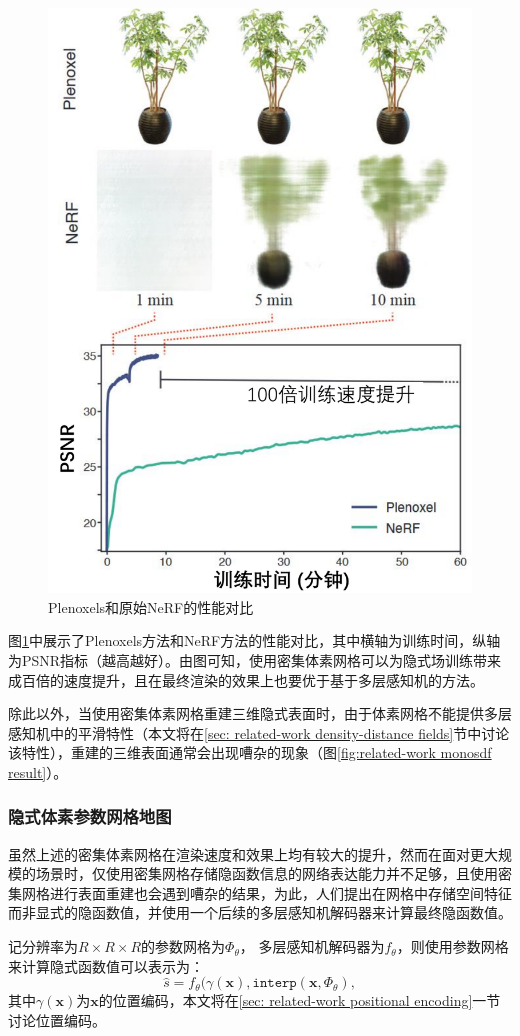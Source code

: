 \begin{figure}[ht]
    \centering
    \includegraphics[width=.5\textwidth]{undergraduate-thesis/images/related-work/plenoxels-result.pdf}
    \caption{Plenoxels\cite{fridovich-keil_plenoxels_2022}和原始NeRF\cite{mildenhall_nerf_2020}的性能对比}
    \label{fig:related-work plenoxels-result}
\end{figure}

图\ref{fig:related-work plenoxels-result}中展示了Plenoxels方法和NeRF方法的性能对比，其中横轴为训练时间，纵轴为PSNR指标（越高越好）。由图可知，使用密集体素网格可以为隐式场训练带来成百倍的速度提升，且在最终渲染的效果上也要优于基于多层感知机的方法。

除此以外，当使用密集体素网格重建三维隐式表面时，由于体素网格不能提供多层感知机中的平滑特性（本文将在\ref{sec: related-work density-distance fields}节中讨论该特性），重建的三维表面通常会出现嘈杂的现象（图\ref{fig:related-work monosdf result}）。

\subsubsection{隐式体素参数网格地图}
虽然上述的密集体素网格在渲染速度和效果上均有较大的提升，然而在面对更大规模的场景时，仅使用密集网格存储隐函数信息的网络表达能力并不足够，且使用密集网格进行表面重建也会遇到嘈杂的结果，为此，人们提出在网格中存储空间特征而非显式的隐函数值\cite{liu_neural_2021, takikawa_neural_2021, yu_monosdf_2022, huang_di-fusion_2021}，并使用一个后续的多层感知机解码器来计算最终隐函数值。

记分辨率为$R\times R\times R$的参数网格为$\Phi_\theta$， 多层感知机解码器为$f_\theta$，则使用参数网格来计算隐式函数值可以表示为：
\begin{equation}
    \hat{s} = f_\theta(\gamma(\mathbf{x}), \mathtt{interp}(\mathbf{x}, \Phi_\theta),
\end{equation}
其中$\gamma(\mathbf{x})$为$\mathbf{x}$的位置编码，本文将在\ref{sec: related-work positional encoding}一节讨论位置编码。

